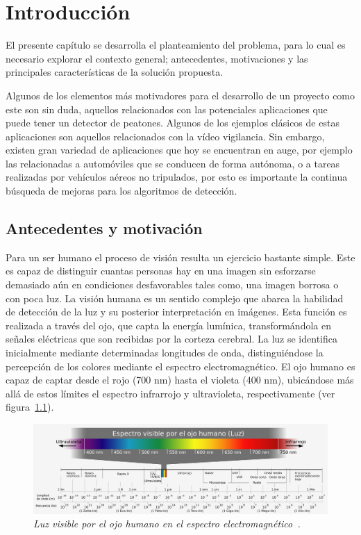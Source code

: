 \chapter{Introducci\'on}
\label{cap:intro}

El presente capítulo se desarrolla el planteamiento del problema, para lo cual es necesario explorar el contexto general; antecedentes, motivaciones y las principales características de la solución propuesta.

Algunos de los elementos más motivadores para el desarrollo de un proyecto como este son sin duda, aquellos relacionados con las potenciales aplicaciones que puede tener un detector de peatones. Algunos de los ejemplos clásicos de estas aplicaciones son aquellos relacionados con la vídeo vigilancia. Sin embargo, existen gran variedad de aplicaciones que hoy se encuentran en auge, por ejemplo las relacionadas a automóviles que se conducen de forma autónoma, o a tareas realizadas por vehículos aéreos no tripulados, por esto es importante la continua búsqueda de mejoras para los algoritmos de detección.

\section{Antecedentes y motivación}
\label{intro:motivacion}

Para un ser humano el proceso de visión resulta un ejercicio bastante simple. Este es capaz de distinguir cuantas personas hay en una imagen sin esforzarse demasiado aún en condiciones desfavorables tales como, una imagen borrosa o con poca luz. La visión humana es un sentido complejo que abarca la habilidad de detección de la luz y su posterior interpretación en imágenes. Esta función es realizada a través del ojo, que capta la energía lumínica, transformándola en señales eléctricas que son recibidas por la corteza cerebral.
La luz se identifica inicialmente mediante determinadas longitudes de onda, distinguiéndose la percepción de los colores mediante el espectro electromagnético. El ojo humano es capaz de captar desde el rojo (700 nm) hasta el violeta (400 nm), ubicándose más allá de estos límites el espectro infrarrojo y ultravioleta, respectivamente (ver figura~\ref{fig:espectro}).

\begin{figure}[h]
  \centering
  \includegraphics[scale=.3]{images/espectro}
  \caption{\em Luz visible por el ojo humano en el espectro electromagnético~\citep{Horst2006}. }  
  \label{fig:espectro}
\end{figure}

